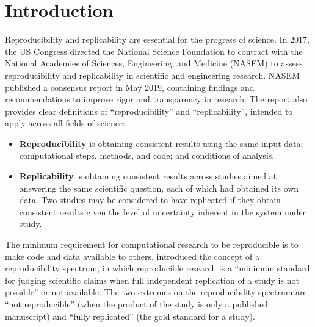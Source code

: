 \section{Introduction}

Reproducibility and replicability are essential for the progress of science.
In 2017, the US Congress directed the National Science Foundation to contract with the National Academies of Sciences, Engineering, and Medicine (NASEM) to assess reproducibility and replicability in scientific and engineering research.
NASEM published a consensus report\supercite{nasem_2019} in May 2019, containing findings and recommendations to improve rigor and transparency in research.
The report also provides clear definitions of ``reproducibility'' and ``replicability'', intended to apply across all fields of science:

\begin{itemize}
  \item[] \textbf{Reproducibility} is obtaining consistent results using the same input data; computational steps, methods, and code; and conditions of analysis.
  \item[] \textbf{Replicability} is obtaining consistent results across studies aimed at answering the same scientific question, each of which had obtained its own data. Two studies may be considered to have replicated if they obtain consistent results given the level of uncertainty inherent in the system under study.
\end{itemize}

The minimum requirement for computational research to be reproducible is to make code and data available to others.
\citet{peng_2011} introduced the concept of a reproducibility spectrum, in which reproducible research is a ``minimum standard for judging scientific claims when full independent replication of a study is not possible'' or not available.
The two extremes on the reproducibility spectrum are ``not reproducible'' (when the product of the study is only a published manuscript) and ``fully replicated'' (the gold standard for a study).

